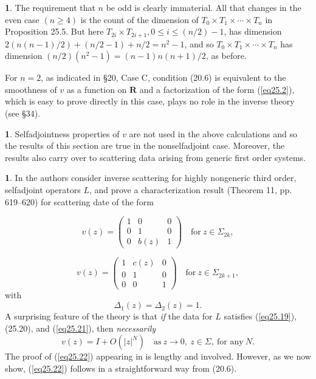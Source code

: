 \documentclass{surv-l}
\theoremstyle{plain}
\theoremstyle{definition}
\newtheorem{remark}[theorem]{\sc{Remark}}
\numberwithin{equation}{chapter}
\begin{document}
\begin{remark}\label{rem25.16}
The requirement that $n$ be odd is clearly immaterial. All that changes in the even case $(n\geq 4)$ is the count of the dimension of $ T_{0}\times  T_{1}\times \cdots \times T_{n}$ in Proposition 25.5. But here $T_{2i}\times T_{2i+1},0\leq i\leq(n/2)-1$, has dimension $2(n(n-1)/2)+(n/2-1)+n/2=n^{2}-1$, and so $ T_{0}\times T_{1}\times \cdots \times T_{n}$ has dimension $(n/2)(n^{2}-1)=(n-1)n(n+1)/2$, as before.
\end{remark}

For $n=2$, as indicated in \S 20, Case C, condition (20.6) is equivalent to the smoothness of $v$ as a function on $\mathbf{R}$ and a factorization of the form (\ref{eq25.2}), which is easy to prove directly in this case, plays no role in the inverse theory (see \S 34).

\begin{remark}\label{rem25.17}
Selfadjointness properties of $v$ are not used in the above calculations and so the results of this section are true in the nonselfadjoint case. Moreover, the results also carry over to scattering data arising from generic first order systems.
\end{remark}

\begin{remark}\label{rem25.18}
In \cite{DTT} the authors consider inverse scattering for highly nongeneric third order, selfadjoint operators $L$, and prove a characterization result (Theorem 11, pp. 619--620) for scattering date of the form
\end{remark}
\setcounter{equation}{18}
\begin{equation}\label{eq25.19}
v(z)=\left(\begin{array}{ccc}
1 & 0 & 0\\
0 & 1 & 0\\
0 & b(z) & 1
\end{array}\right)\quad \mathrm{for}\ z\in\Sigma_{2k},
\end{equation}


\begin{equation}\label{eq25.20}
v(z)=\left(\begin{array}{ccc}
1 & c(z) & 0\\
0 & 1 & 0\\
0 & 0 & 1
\end{array}\right)\quad  \mathrm{for}\ z\in\Sigma_{2k+1},
\end{equation}
with
\begin{equation}\label{eq25.21}
\Delta_{1}(z)=\Delta_{2}(z)=1.
\end{equation}
A surprising feature of the theory is that \emph{if} the data for $L$ satisfies (\ref{eq25.19}), (25.20), and (\ref{eq25.21}), then \emph{necessarily}
\begin{equation}\label{eq25.22}
v(z)=I+O(|z|^{N})\quad \mathrm{as}\ z\rightarrow 0,\ z\in\Sigma,\ \text{for any}\ N.
\end{equation}
The proof of (\ref{eq25.22}) appearing in \cite{DTT} is lengthy and involved. However, as we now show, (\ref{eq25.22}) follows in a straightforward way from (20.6).
\end{document}
